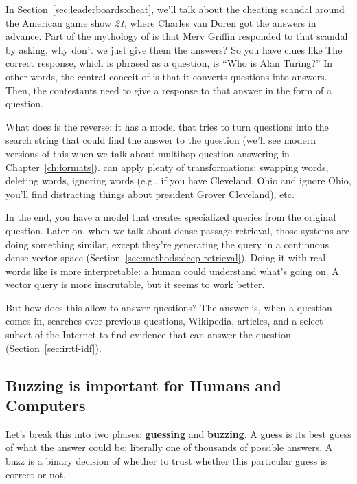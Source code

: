 In Section~\ref{sec:leaderboards:cheat}, we'll talk about the cheating scandal
around the American game show \textit{21}, where Charles van Doren got
the answers in advance.
%
Part of the mythology of \jeopardy{} is that Merv Griffin responded to
that scandal by asking, why don't we just give them the answers?
%
So you have clues like 
%
The correct response, which is phrased as a question, is
``Who is Alan Turing?''
%
In other words, the central conceit of \jeopardy{} is that it converts
questions into answers.
%
Then, the contestants need to give a response to that answer
in the form of a question.

What  does is the reverse: it has a model that tries to turn
questions into the search string that could find the answer to the
question (we'll see modern versions of this when we talk about
multihop question answering in Chapter~\ref{ch:formats}).
%
 can apply plenty of transformations: swapping words,
deleting words, ignoring words (e.g., if you have Cleveland, Ohio and ignore
Ohio, you’ll find distracting things about  president Grover Cleveland), etc.


In the end, you have a model that creates specialized queries from the
original question.
%
Later on, when we talk about dense passage retrieval, those systems
are doing something similar, except they’re generating the query in a
continuous dense vector space
(Section~\ref{sec:methods:deep-retrieval}).
%
Doing it with real words like  is more interpretable: a human
could understand what's going on.
%
A vector query is more inscrutable, but it seems to work better.

But how does this allow \watson{} to answer questions?
%
The answer is, when a question comes in, \watson{} searches over previous \jeopardy{}
questions, Wikipedia, articles, and a select subset of the Internet to find
evidence that can answer the question (Section~\ref{sec:ir:tf-idf}).

\subsection{Buzzing is important for Humans and Computers}

Let's break this into two phases: {\bf guessing} and {\bf buzzing}.
%
A guess is its best guess of what the answer could be: literally one of
thousands of possible answers.
%
A buzz is a binary decision of whether to trust whether this particular guess
is correct or not.

